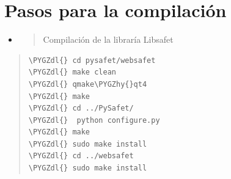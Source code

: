 \documentclass[letterpaper,11pt,spanish]{sphinxmanual}
\def\PYGZdl{\char`\$}
\def\PYGZhy{\char`\-}
\begin{document}
\section{Pasos para la compilación}
\label{_templates/Contenido1/Dependencias:pasos-para-la-compilacion}\begin{itemize}
\item {} \begin{quote}\begin{description}
\item[{Compilación de la libraría Libsafet}] \leavevmode
\end{description}\end{quote}

\end{itemize}
\begin{quote}

\begin{Verbatim}[commandchars=\\\{\}]
\PYGZdl{} cd pysafet/websafet
\PYGZdl{} make clean
\PYGZdl{} qmake\PYGZhy{}qt4
\PYGZdl{} make
\PYGZdl{} cd ../PySafet/
\PYGZdl{}  python configure.py
\PYGZdl{} make
\PYGZdl{} sudo make install
\PYGZdl{} cd ../websafet
\PYGZdl{} sudo make install
\end{Verbatim}
\end{quote}
\end{document}
